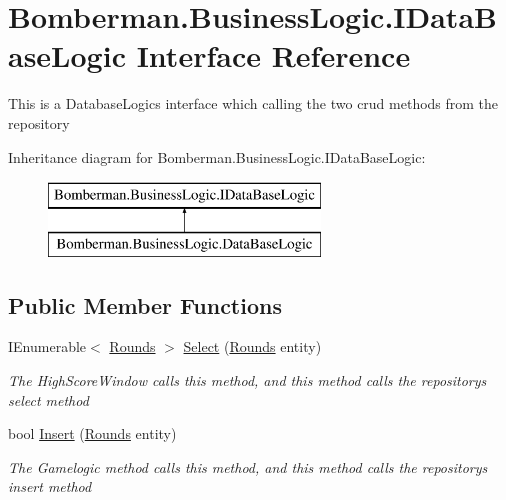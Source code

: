 \hypertarget{interface_bomberman_1_1_business_logic_1_1_i_data_base_logic}{}\section{Bomberman.\+Business\+Logic.\+I\+Data\+Base\+Logic Interface Reference}
\label{interface_bomberman_1_1_business_logic_1_1_i_data_base_logic}


This is a Database\+Logic\textquotesingle{}s interface which calling the two crud methods from the repository  


Inheritance diagram for Bomberman.\+Business\+Logic.\+I\+Data\+Base\+Logic\+:\begin{figure}[H]
\begin{center}
\leavevmode
\includegraphics[height=2.000000cm]{interface_bomberman_1_1_business_logic_1_1_i_data_base_logic}
\end{center}
\end{figure}
\subsection*{Public Member Functions}
\begin{DoxyCompactItemize}
\item 
I\+Enumerable$<$ \mbox{\hyperlink{class_bomberman_1_1_data_1_1_rounds}{Rounds}} $>$ \mbox{\hyperlink{interface_bomberman_1_1_business_logic_1_1_i_data_base_logic_aaa56c20c9b41d5f4a3c2522f450ecb41}{Select}} (\mbox{\hyperlink{class_bomberman_1_1_data_1_1_rounds}{Rounds}} entity)
\begin{DoxyCompactList}\small\item\em The High\+Score\+Window calls this method, and this method calls the repository\textquotesingle{}s select method \end{DoxyCompactList}\item 
bool \mbox{\hyperlink{interface_bomberman_1_1_business_logic_1_1_i_data_base_logic_a1b8fde3e85c9ba91acbf4185a227f23b}{Insert}} (\mbox{\hyperlink{class_bomberman_1_1_data_1_1_rounds}{Rounds}} entity)
\begin{DoxyCompactList}\small\item\em The Gamelogic method calls this method, and this method calls the repository\textquotesingle{}s insert method \end{DoxyCompactList}\end{DoxyCompactItemize}


